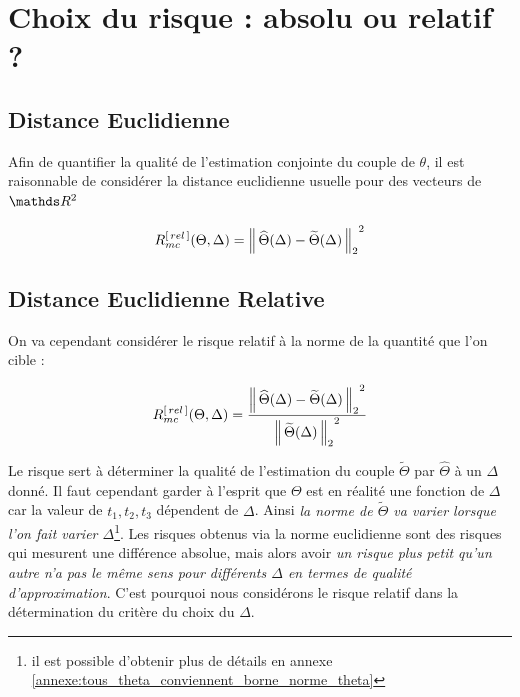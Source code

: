 \section{Choix du risque : absolu ou relatif ?}
\label{annexe:choix-du-rique}

\subsection{Distance Euclidienne}

Afin de quantifier la qualité de l'estimation conjointe du couple de $\theta$, il est raisonnable de considérer la distance euclidienne usuelle pour des vecteurs de $\R 2$

\begin{equation*}
	R^{[\,rel\,]}_{mc}(\Theta, \Delta) = {\distnorme 2 {\widehat \Theta(\Delta)} {\widetilde \Theta(\Delta)}}^2
\end{equation*}


\subsection{Distance Euclidienne Relative}

On va cependant considérer le risque relatif à la norme de la quantité que l'on cible :

\begin{equation*}
	R^{[\,rel\,]}_{mc}(\Theta, \Delta) =\frac{ {\distnorme 2 {\widehat \Theta(\Delta)} {\widetilde \Theta(\Delta)}}^2}{ {\norme 2 {\widetilde \Theta(\Delta)}}^2 }
\end{equation*}


Le risque sert à déterminer la qualité de l'estimation du couple $\widetilde \Theta$ par $\widehat \Theta$ à un $\Delta$ donné. Il faut cependant garder à l'esprit que $\Theta$ est en réalité une fonction de $\Delta$ car la valeur de $t_1, t_2, t_3$ dépendent de $\Delta$. Ainsi \emph{la norme de $\widetilde \Theta$ va varier lorsque l'on fait varier $\Delta$}\footnote{il est possible d'obtenir plus de détails en annexe \ref{annexe:tous_theta_conviennent_borne_norme_theta}}. Les risques obtenus via la norme euclidienne sont des risques qui mesurent une différence absolue, mais alors avoir \emph{un risque plus petit qu'un autre n'a pas le même sens pour différents $\Delta$ en termes de qualité d'approximation}. C'est pourquoi nous considérons le risque relatif dans la détermination du critère du choix du $\Delta$.

